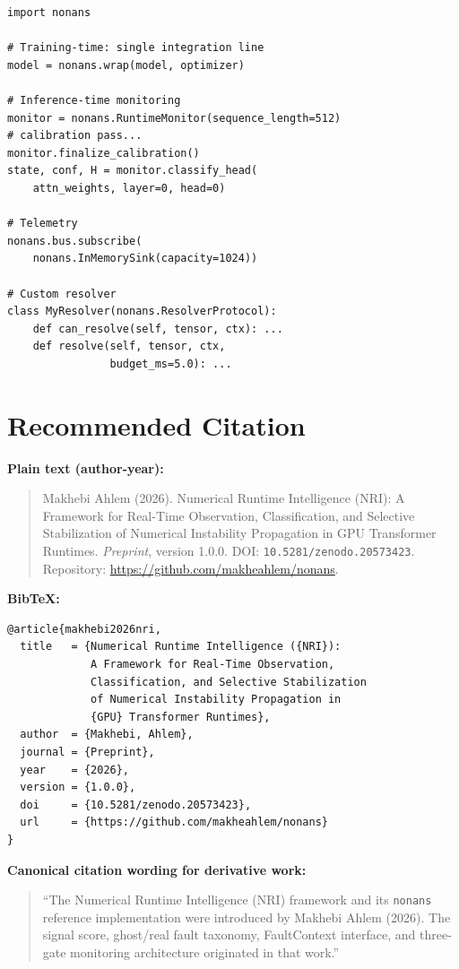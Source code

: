\documentclass[11pt,a4paper]{article}
\theoremstyle{plain}
\begin{document}
\begin{verbatim}
import nonans

# Training-time: single integration line
model = nonans.wrap(model, optimizer)

# Inference-time monitoring
monitor = nonans.RuntimeMonitor(sequence_length=512)
# calibration pass...
monitor.finalize_calibration()
state, conf, H = monitor.classify_head(
    attn_weights, layer=0, head=0)

# Telemetry
nonans.bus.subscribe(
    nonans.InMemorySink(capacity=1024))

# Custom resolver
class MyResolver(nonans.ResolverProtocol):
    def can_resolve(self, tensor, ctx): ...
    def resolve(self, tensor, ctx,
                budget_ms=5.0): ...
\end{verbatim}

\section{Recommended Citation}
\label{app:citation}

\textbf{Plain text (author-year):}

\begin{quote}\small
Makhebi Ahlem (2026). Numerical Runtime Intelligence (NRI): A Framework
for Real-Time Observation, Classification, and Selective Stabilization
of Numerical Instability Propagation in GPU Transformer Runtimes.
\textit{Preprint}, version 1.0.0.
DOI: \texttt{10.5281/zenodo.20573423}.
Repository: \url{https://github.com/makheahlem/nonans}.
\end{quote}

\textbf{BibTeX:}

\begin{verbatim}
@article{makhebi2026nri,
  title   = {Numerical Runtime Intelligence ({NRI}):
             A Framework for Real-Time Observation,
             Classification, and Selective Stabilization
             of Numerical Instability Propagation in
             {GPU} Transformer Runtimes},
  author  = {Makhebi, Ahlem},
  journal = {Preprint},
  year    = {2026},
  version = {1.0.0},
  doi     = {10.5281/zenodo.20573423},
  url     = {https://github.com/makheahlem/nonans}
}
\end{verbatim}

\textbf{Canonical citation wording for derivative work:}

\begin{quote}\small
``The Numerical Runtime Intelligence (NRI) framework and its
\texttt{nonans} reference implementation were introduced by
Makhebi Ahlem (2026).
The signal score, ghost/real fault taxonomy, FaultContext interface,
and three-gate monitoring architecture originated in that work.''
\end{quote}
\end{document}
